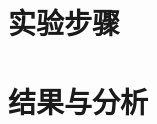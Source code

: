 \documentclass[12pt,UTF8]{ctexart}
\begin{document}
\begin{spacing}{1.1}








\section{实验步骤}




\section{结果与分析}




\end{spacing}
\end{document}
